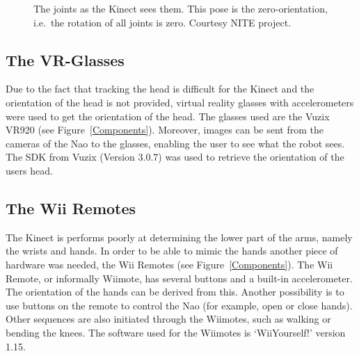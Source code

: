 \documentclass[letterpaper, 10pt, conference]{ieeeconf}
\begin{document}
\begin{figure}[htb]
\label{KinectJoints}
\caption{The joints as the Kinect sees them. This pose is the zero-orientation, i.e.\ the rotation of all joints is zero. Courtesy NITE project.}
\end{figure}

\subsection{The VR-Glasses}
Due to the fact that tracking the head is difficult for the Kinect and the orientation of the head is not provided, virtual reality glasses with accelerometers were used to get the orientation of the head. 
The glasses used are the Vuzix VR920 (see Figure~\ref{Components}). Moreover, images can be sent from the cameras of the Nao to the glasses, enabling the user to see what the robot sees. 
The SDK from Vuzix (Version 3.0.7) was used to retrieve the orientation of the users head.
\subsection{The Wii Remotes}
The Kinect is performs poorly at determining the lower part of the arms, namely the wrists and hands. In order to be able to mimic the hands another piece of hardware was needed, the Wii Remotes (see Figure~\ref{Components}). The Wii Remote, or informally Wiimote, has several buttons and a built-in accelerometer. The orientation of the hands can be derived from this. Another possibility is to use buttons on the remote to control the Nao (for example, open or close hands). Other sequences are also initiated through the Wiimotes, such as walking or bending the knees.
The software used for the Wiimotes is `WiiYourself!'  version 1.15.
\end{document}
